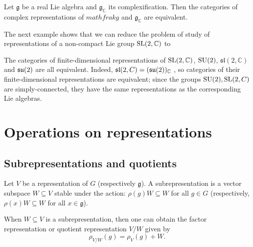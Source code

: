\documentclass{report}
\begin{document}
\begin{lemma}
    Let $\mathfrak g $ be a real Lie algebra and $\mathfrak g_{\mathbb C}$ its complexification.
    Then the categories of complex representations of $mathfrak g$ and $\mathfrak g_{\mathbb C}$ are equivalent.
\end{lemma}
The next example shows that we can reduce the problem of study of representations of a non-compact Lie group $\operatorname{{\mathrm{SL}}}(2, \mathbb C)$ to 
\begin{example}
    The categories of ﬁnite-dimensional representations of $\operatorname{{\mathrm{SL}}}(2, \mathbb C)$,
$\operatorname{{\mathrm{SU}}}(2)$, $\mathfrak{sl}(2, \mathbb C)$ and $\operatorname{{\mathfrak{su}}}(2)$ are all equivalent. Indeed,
$\mathfrak{sl}(2, C) = (\operatorname{{\mathfrak{su}}}(2))_{\mathbb C}$ , so categories of their ﬁnite-dimensional representations are equivalent; since the groups $\operatorname{{\mathrm{SU}}}(2), \operatorname{{\mathrm{SL}}}(2, C)$ are simply-connected, they
have the same representations as the corresponding Lie algebras.
\end{example}

\section{Operations on representations}
\subsection{Subrepresentations and quotients}

\begin{definition}
    Let $V$ be a representation of $G$ (respectively $\mathfrak g$). 
    A subrepresentation is a vector subspace $W \subseteq V$ stable under the action:
    $\rho(g)W \subseteq W$ for all $g \in G$ (respectively, $\rho(x)W \subseteq W$ for all $x \in \mathfrak g$).
\end{definition}

When $W \subseteq V$ is a subrepresentation, then one can obtain the factor representation or quotient representation $V/W$ given by
\[
\rho_{V/W}(g) = \rho_V(g) + W.
\]
\end{document}
